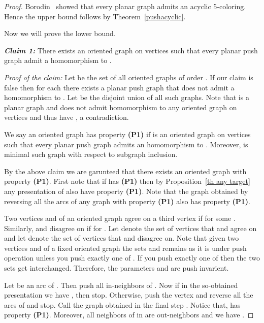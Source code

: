 \documentclass[10pt]{article}
\begin{document}
\begin{proof}
Borodin~\cite{Borodinacyclic} 
showed that every planar graph 
admits an acyclic 5-coloring. 
Hence the upper bound follows by Theorem~\ref{pushacyclic}.


\medskip

Now we will prove the lower bound. 

\medskip


\textbf{\textit{Claim 1:}} There exists an oriented graph  on  vertices such that every
planar push graph admit a homomorphism to . 

\medskip

\textit{Proof of the claim:} Let  be the set of all oriented graphs of order  
. If our claim is false then for each  there exists a planar push graph 
 that does not admit a homomorphism to . 
Let  be the disjoint union of all such graphs. Note that  is a planar graph and does not admit homomorphism to any oriented graph on  vertices and thus have , a contradiction. \hfill 

\medskip



We say an oriented graph  has property \textbf{(P1)} if  is an oriented graph on 
   vertices such that every
planar push graph admits an homomorphism to . 
Moreover,   is minimal such graph with respect to subgraph inclusion. 

By the above claim we are garunteed that there exists an oriented graph  with property \textbf{(P1)}.
First note that if  has \textbf{(P1)} then by Proposition~\ref{th any target} any presentation of  also have  property \textbf{(P1)}.
Note that the graph obtained by reversing all the arcs of  any graph with  property \textbf{(P1)} also has property \textbf{(P1)}. 

Two vertices  and  of an oriented graph agree on a third vertex  if  for 
some . Similarly, 
 and  disagree on   if  for . Let  denote the set of vertices that  and  agree on and let  denote the set of vertices that  and  disagree on. Note that 
given two vertices  and  of a fixed oriented graph the sets  and  remains as it is under push operation unless you push exactly one of . If you push exactly one of  then the two sets get interchanged. 
Therefore, the parameters  and  are push invarient. 



Let  be an arc of . Then push all in-neighbors of . Now if in the so-obtained presentation  we have , then stop. 
Otherwise, 
push the vertex  and reverse all the arcs of  and stop. Call the graph obtained in the final step 
. Notice that,    has property \textbf{(P1)}. Moreover, all neighbors of  in 
 are out-neighbors and we have .



\end{proof}
\end{document}
